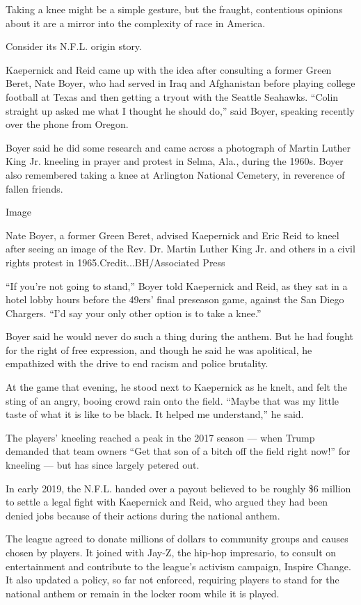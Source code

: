 Taking a knee might be a simple gesture, but the fraught, contentious
opinions about it are a mirror into the complexity of race in America.

Consider its N.F.L. origin story.

Kaepernick and Reid came up with the idea after consulting a former
Green Beret, Nate Boyer, who had served in Iraq and Afghanistan before
playing college football at Texas and then getting a tryout with the
Seattle Seahawks. ``Colin straight up asked me what I thought he should
do,'' said Boyer, speaking recently over the phone from Oregon.

Boyer said he did some research and came across a photograph of Martin
Luther King Jr. kneeling in prayer and protest in Selma, Ala., during
the 1960s. Boyer also remembered taking a knee at Arlington National
Cemetery, in reverence of fallen friends.

Image

Nate Boyer, a former Green Beret, advised Kaepernick and Eric Reid to
kneel after seeing an image of the Rev. Dr. Martin Luther King Jr. and
others in a civil rights protest in 1965.Credit...BH/Associated Press

``If you're not going to stand,'' Boyer told Kaepernick and Reid, as
they sat in a hotel lobby hours before the 49ers' final preseason game,
against the San Diego Chargers. ``I'd say your only other option is to
take a knee.''

Boyer said he would never do such a thing during the anthem. But he had
fought for the right of free expression, and though he said he was
apolitical, he empathized with the drive to end racism and police
brutality.

At the game that evening, he stood next to Kaepernick as he knelt, and
felt the sting of an angry, booing crowd rain onto the field. ``Maybe
that was my little taste of what it is like to be black. It helped me
understand,'' he said.

The players' kneeling reached a peak in the 2017 season --- when Trump
demanded that team owners ``Get that son of a bitch off the field right
now!'' for kneeling --- but has since largely petered out.

In early 2019, the N.F.L. handed over a payout believed to be roughly
\$6 million to settle a legal fight with Kaepernick and Reid, who argued
they had been denied jobs because of their actions during the national
anthem.

The league agreed to donate millions of dollars to community groups and
causes chosen by players. It joined with Jay-Z, the hip-hop impresario,
to consult on entertainment and contribute to the league's activism
campaign, Inspire Change. It also updated a policy, so far not enforced,
requiring players to stand for the national anthem or remain in the
locker room while it is played.

